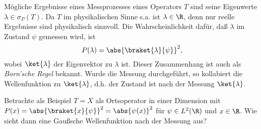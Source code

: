 \documentclass{subfiles}
\begin{document}

    Mögliche Ergebnisse eines Messprozesses eines Operators $T$ sind seine Eigenwerte $\lambda\in\sigma_P(T)$. Da $T$ im physikalischen Sinne s.a. ist $\lambda\in\R$, denn nur reelle Ergebnisse sind physikalisch sinnvoll. Die Wahrscheinlichkeit dafür, daß $\lambda$ im Zustand $\psi$ gemessen wird, ist 
    \[
        P(\lambda) = \abs{\braket{\lambda}{\psi}}^2,
    \]
    wobei $\ket{\lambda}$ der Eigenvektor zu $\lambda$ ist. Dieser Zusammenhang ist auch als \emph{Born'sche Regel} bekannt. Wurde die Messung durchgeführt, so kollabiert die Wellenfunktion zu $\ket{\lambda}$, d.h. der Zustand ist nach der Messung $\ket{\lambda}$. 
    \begin{Aufgabe}
        \nr{} Betrachte als Beispiel $T = X$ als Ortsoperator in einer Dimension mit $P(x) = \abs{\braket{x}{\psi}}^2 = \abs{\psi(x)}^2$ für $\psi\in L^2(\R)$ und $x\in\R$. Wie sieht dann eine Gaußsche Wellenfunktion nach der Messung aus? 
    \end{Aufgabe}
\end{document}
